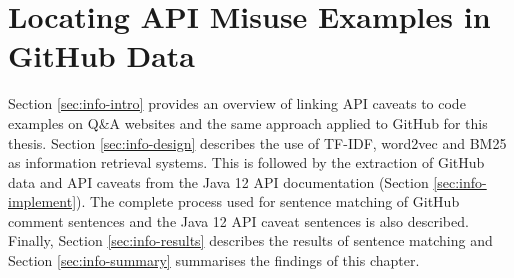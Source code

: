 \chapter{Locating API Misuse Examples in GitHub Data}
\label{cha:infoRetrieval}
Section \ref{sec:info-intro} provides an overview of linking API caveats to code examples on Q\&A websites and the same approach applied to GitHub for this thesis. Section \ref{sec:info-design} describes the use of TF-IDF, word2vec and BM25 as information retrieval systems. This is followed by the extraction of GitHub data and API caveats from the Java 12 API documentation (Section \ref{sec:info-implement}). The complete process used for sentence matching of GitHub comment sentences and the Java 12 API caveat sentences is also described. Finally, Section \ref{sec:info-results} describes the results of sentence matching and Section \ref{sec:info-summary} summarises the findings of this chapter.

